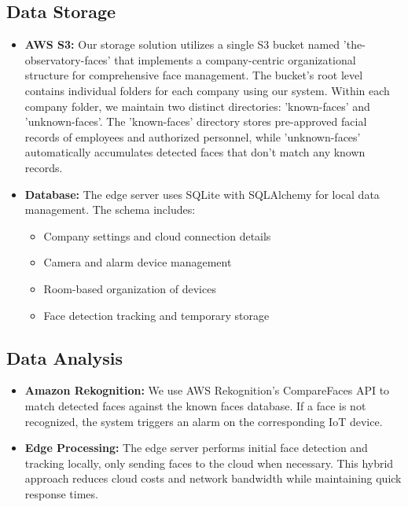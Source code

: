 \documentclass[conference]{IEEEtran}
\begin{document}
\subsection{Data Storage}
\begin{itemize}
      \item \textbf{AWS S3:} Our storage solution utilizes a single S3 bucket named 'the-observatory-faces' that implements
            a company-centric organizational structure for comprehensive face management. The bucket's root level contains
            individual folders for each company using our system. Within each company folder, we maintain two distinct directories:
            'known-faces' and 'unknown-faces'. The 'known-faces' directory stores pre-approved facial records of employees and
            authorized personnel, while 'unknown-faces' automatically accumulates detected faces that don't match any known records.
      \item \textbf{Database:} The edge server uses SQLite with SQLAlchemy for local data management. The schema includes:
            \begin{itemize}
                  \item Company settings and cloud connection details
                  \item Camera and alarm device management
                  \item Room-based organization of devices
                  \item Face detection tracking and temporary storage
            \end{itemize}
\end{itemize}

\subsection{Data Analysis}
\begin{itemize}
      \item \textbf{Amazon Rekognition:} We use AWS Rekognition's CompareFaces API to match detected faces against the known faces
            database. If a face is not recognized, the system triggers an alarm on the corresponding IoT device.
      \item \textbf{Edge Processing:} The edge server performs initial face detection and tracking locally, only sending faces to
            the cloud when necessary. This hybrid approach reduces cloud costs and network bandwidth while maintaining quick response times.
\end{itemize}
\end{document}
